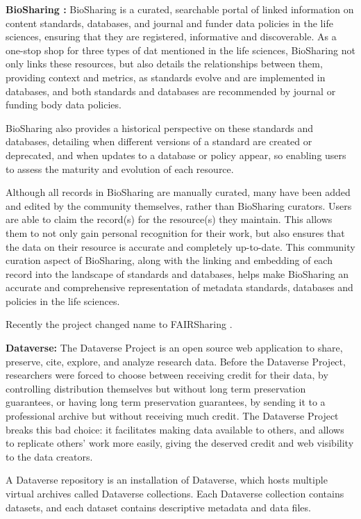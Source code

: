 \textbf{BioSharing \cite{biosharing}:}
BioSharing is a curated, searchable portal of linked information on content standards,
databases, and journal and funder data policies in the life sciences, ensuring that
they are registered, informative and discoverable.
As a one-stop shop for three types of dat mentioned in the life sciences, BioSharing
not only links these resources, but also details the relationships between them,
providing context and metrics, as standards evolve and are implemented in databases,
and both standards and databases are recommended by journal or funding body data
policies.

BioSharing also provides a historical perspective on these standards and databases,
detailing when different versions of a standard are created or deprecated, and when
updates to a database or policy appear, so enabling users to assess the maturity and
evolution of each resource.

Although all records in BioSharing are manually curated, many have been added and
edited by the community themselves, rather than BioSharing curators.
Users are able to claim the record(s) for the resource(s) they maintain.
This allows them to not only gain personal recognition for their work, but also ensures
that the data on their resource is accurate and completely up-to-date.
This community curation aspect of BioSharing, along with the linking and embedding of
each record into the landscape of standards and databases, helps make BioSharing an
accurate and comprehensive representation of metadata standards, databases and policies
in the life sciences.

Recently the project changed name to FAIRSharing \cite{fairsharing}.

\textbf{Dataverse\cite{dataverse}:}
The Dataverse Project is an open source web application to share, preserve, cite, explore, and analyze research data.
Before the Dataverse Project, researchers were forced to choose between receiving credit for their data, by controlling distribution themselves but without long term preservation guarantees, or having long term preservation guarantees, by sending it to a professional archive but without receiving much credit.
The Dataverse Project breaks this bad choice: it facilitates making data available to others, and allows to replicate others' work more easily, giving the deserved credit and web visibility to the data creators.

A Dataverse repository is an installation of Dataverse, which hosts multiple virtual archives called Dataverse collections.
Each Dataverse collection contains datasets, and each dataset contains descriptive metadata and data files.


